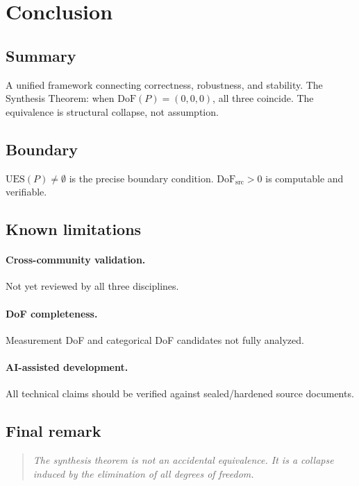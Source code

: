 \section{Conclusion}
\label{sec:conclusion}

\subsection{Summary}

A unified framework connecting correctness, robustness, and stability.
The Synthesis Theorem: when $\mathrm{DoF}(P)=(0,0,0)$, all three coincide.
The equivalence is structural collapse, not assumption.

\subsection{Boundary}

$\mathrm{UES}(P)\neq\emptyset$ is the precise boundary condition.
$\mathrm{DoF}_{\mathrm{src}}>0$ is computable and verifiable.

\subsection{Known limitations}

\paragraph{Cross-community validation.} Not yet reviewed by all three disciplines.

\paragraph{DoF completeness.} Measurement DoF and categorical DoF candidates not fully analyzed.

\paragraph{AI-assisted development.}
All technical claims should be verified against sealed/hardened source documents.

\subsection{Final remark}

\begin{quote}\itshape
The synthesis theorem is not an accidental equivalence.
It is a collapse induced by the elimination of all degrees of freedom.
\end{quote}


